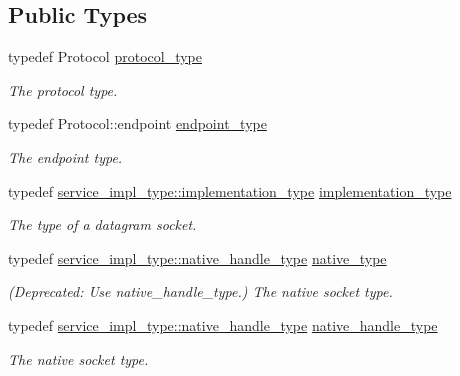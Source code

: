 \subsection*{Public Types}
\begin{DoxyCompactItemize}
\item 
typedef Protocol \hyperlink{classasio_1_1datagram__socket__service_a0c35d47066a6056f723d53a3c68685db}{protocol\+\_\+type}
\begin{DoxyCompactList}\small\item\em The protocol type. \end{DoxyCompactList}\item 
typedef Protocol\+::endpoint \hyperlink{classasio_1_1datagram__socket__service_a135b71c44f1e92b67cea4402f46578a9}{endpoint\+\_\+type}
\begin{DoxyCompactList}\small\item\em The endpoint type. \end{DoxyCompactList}\item 
typedef \hyperlink{structasio_1_1detail_1_1reactive__socket__service_1_1implementation__type}{service\+\_\+impl\+\_\+type\+::implementation\+\_\+type} \hyperlink{classasio_1_1datagram__socket__service_a41dcdc6b8a3500d6f88e10b6c08925cd}{implementation\+\_\+type}
\begin{DoxyCompactList}\small\item\em The type of a datagram socket. \end{DoxyCompactList}\item 
typedef \hyperlink{classasio_1_1detail_1_1reactive__socket__service_a2fc869359f3eb7b6f25925f10e594e1d}{service\+\_\+impl\+\_\+type\+::native\+\_\+handle\+\_\+type} \hyperlink{classasio_1_1datagram__socket__service_ab82ab07dd8513f35b991a03e3e386e9d}{native\+\_\+type}
\begin{DoxyCompactList}\small\item\em (Deprecated\+: Use native\+\_\+handle\+\_\+type.) The native socket type. \end{DoxyCompactList}\item 
typedef \hyperlink{classasio_1_1detail_1_1reactive__socket__service_a2fc869359f3eb7b6f25925f10e594e1d}{service\+\_\+impl\+\_\+type\+::native\+\_\+handle\+\_\+type} \hyperlink{classasio_1_1datagram__socket__service_a78991c47ea915a16f6399d64e731ac07}{native\+\_\+handle\+\_\+type}
\begin{DoxyCompactList}\small\item\em The native socket type. \end{DoxyCompactList}\end{DoxyCompactItemize}
